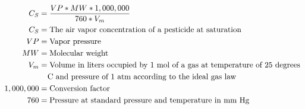 \documentclass[fleqn, oneside, 11pt]{article}%
\begin{document}
\begin{preview}
\begin{align*}%
C_{S} & =  \frac{VP * MW * 1,000,000}{760 * V_{m}} \nonumber \\
C_{S} & =  \text{The air vapor concentration of a pesticide at saturation} \nonumber \\
VP & =  \text{Vapor pressure} \nonumber \\
MW & =  \text{Molecular weight} \nonumber \\
V_{m} & =  \text{Volume in liters occupied by 1 mol of a gas at temperature of 25 degrees } \nonumber \\
&    \hspace{.15in} \text{C and pressure of 1 atm according to the ideal gas law} \nonumber\\
1,000,000 & =  \text{Conversion factor} \nonumber \\
760 & =  \text{Pressure at standard pressure and temperature in mm Hg} \nonumber \\
\end{align*} 
\end{preview}
\end{document}
